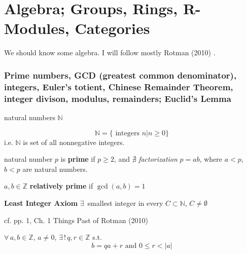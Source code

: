 \part{Algebra; Groups, Rings, R-Modules, Categories}


We should know some algebra.  I will follow mostly Rotman (2010) \cite{agat:JRotman2010}.  

\section{Prime numbers, GCD (greatest common denominator), integers, Euler's totient, Chinese Remainder Theorem, integer divison, modulus, remainders; Euclid's Lemma}






\begin{definition}
	natural numbers $\mathbb{N}$  
	
	\begin{equation}
	\mathbb{N} = \lbrace \text{ integers } n | n \geq 0 \rbrace  
	\end{equation}
i.e. $\mathbb{N}$ is set of all nonnegative integers.  	
\end{definition}

\begin{definition}[prime]
natural number $p$ is \textbf{prime} if $p\geq 2$, and $\nexists$ \emph{ factorization} $p=ab$, where $a<p$, $b<p$ are natural numbers.  	
\end{definition}

\begin{definition}
	$a,b\in \mathbb{Z}$ \textbf{relatively prime} if $\gcd(a,b)=1 $
\end{definition}









\begin{axiom} \textbf{Least Integer Axiom}
	$\exists \, $ smallest integer in every $C \subset \mathbb{N}$, $C\neq \emptyset$
\end{axiom}
cf. pp. 1, Ch. 1 Things Past of Rotman (2010) \cite{agat:JRotman2010}  


\begin{theorem}\label{agat:Thm:DivisionAlgorithm} 
	$\forall \, a , b \in \mathbb{Z}$, $a\neq 0$, $\exists \, ! \, q,r \in \mathbb{Z}$ s.t. 
	\[
	b = qa + r \text{ and } 0 \leq r < |a|
	\]
\end{theorem}


